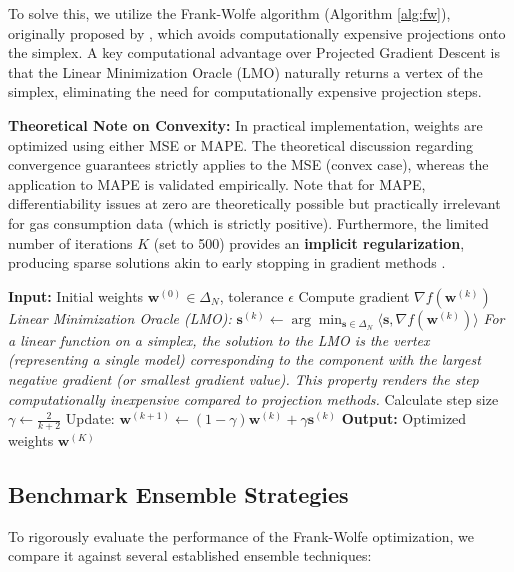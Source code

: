 \documentclass[journal,article,submit,pdftex,moreauthors]{Definitions/mdpi}
\begin{document}
To solve this, we utilize the Frank-Wolfe algorithm (Algorithm \ref{alg:fw}), originally proposed by \citep{ref_fw_orig}, which avoids computationally expensive projections onto the simplex. A key computational advantage over Projected Gradient Descent is that the Linear Minimization Oracle (LMO) naturally returns a vertex of the simplex, eliminating the need for computationally expensive projection steps.

\textbf{Theoretical Note on Convexity:} In practical implementation, weights are optimized using either MSE or MAPE. The theoretical discussion regarding convergence guarantees strictly applies to the MSE (convex case), whereas the application to MAPE is validated empirically. Note that for MAPE, differentiability issues at zero are theoretically possible but practically irrelevant for gas consumption data (which is strictly positive). Furthermore, the limited number of iterations $K$ (set to 500) provides an \textbf{implicit regularization}, producing sparse solutions akin to early stopping in gradient methods \citep{ref_fw_jaggi}.

\begin{algorithm}[H]
\caption{Frank-Wolfe for Ensemble Weights Optimization}
\label{alg:fw}
\begin{algorithmic}[1]
\STATE \textbf{Input:} Initial weights $\mathbf{w}^{(0)} \in \Delta_N$, tolerance $\epsilon$
    \STATE Compute gradient $\nabla f(\mathbf{w}^{(k)})$
    \STATE \textit{Linear Minimization Oracle (LMO):}
    \STATE $\mathbf{s}^{(k)} \leftarrow \arg\min_{\mathbf{s} \in \Delta_N} \langle \mathbf{s}, \nabla f(\mathbf{w}^{(k)}) \rangle$
    \STATE \textit{For a linear function on a simplex, the solution to the LMO is the vertex (representing a single model) corresponding to the component with the largest negative gradient (or smallest gradient value). This property renders the step computationally inexpensive compared to projection methods.}
    \STATE Calculate step size $\gamma \leftarrow \frac{2}{k+2}$
    \STATE Update: $\mathbf{w}^{(k+1)} \leftarrow (1-\gamma)\mathbf{w}^{(k)} + \gamma \mathbf{s}^{(k)}$
\ENDFOR
\STATE \textbf{Output:} Optimized weights $\mathbf{w}^{(K)}$
\end{algorithmic}
\end{algorithm}

\subsection{Benchmark Ensemble Strategies}
To rigorously evaluate the performance of the Frank-Wolfe optimization, we compare it against several established ensemble techniques:
\end{document}
